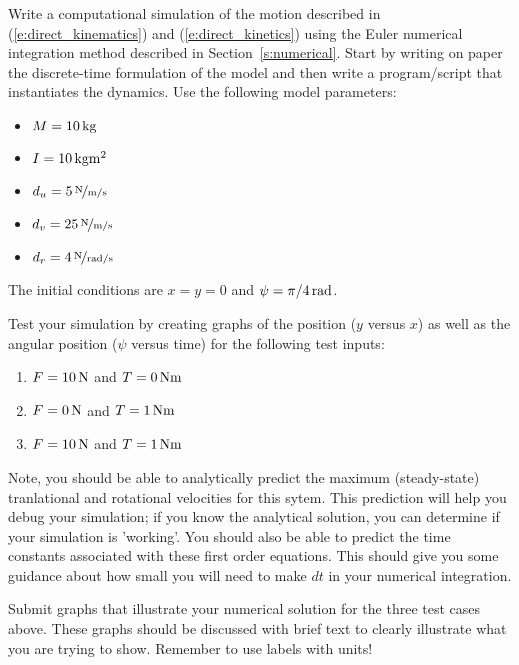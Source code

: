 \begin{ex}
Write a computational simulation of the motion described in (\ref{e:direct_kinematics}) and (\ref{e:direct_kinetics}) using the Euler numerical integration method described in Section~\ref{s:numerical}.  Start by writing on paper the discrete-time formulation of the model and then write a program/script that instantiates the dynamics.  Use the following model parameters:
\begin{itemize}
\item $M=\unit[10]{kg}$
\item $I=\unit[10]{kg m^2}$
\item $d_u=\unitfrac[5]{N}{m/s}$
\item $d_v=\unitfrac[25]{N}{m/s}$
\item $d_r=\unitfrac[4]{N}{rad/s}$
\end{itemize}

\noindent
The initial conditions are $x=y=0$ and $\psi = \unit[\pi/4]{rad}$.  

\noindent
Test your simulation by creating graphs of the position ($y$ versus $x$) as well as the angular position ($\psi$ versus time) for the following test inputs:
\begin{enumerate}
\item $F = \unit[10]{N}$ and $T = \unit[0]{Nm}$
\item $F = \unit[0]{N}$ and $T = \unit[1]{Nm}$
\item $F = \unit[10]{N}$ and $T = \unit[1]{Nm}$
\end{enumerate}


Note, you should be able to analytically predict the maximum (steady-state) tranlational and rotational velocities for this sytem.  This prediction will help you debug your simulation; if you know the analytical solution, you can determine if your simulation is 'working'.  You should also be able to predict the time constants associated with these first order equations.  This should give you some guidance about how small you will need to make $dt$ in your numerical integration.

Submit graphs that illustrate your numerical solution for the three test cases above.  These graphs should be discussed with brief text to clearly illustrate what you are trying to show.  Remember to use labels with units!

\end{ex}


